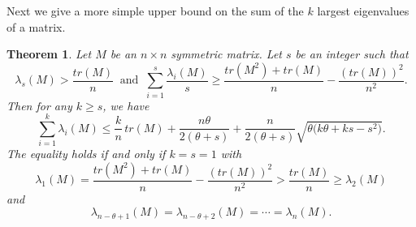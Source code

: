 \documentclass[12pt]{article}
\newtheorem{theorem}{Theorem}[section]
\begin{document}
Next we give a more simple upper bound on the sum of the $k$ largest eigenvalues of a matrix.
 \begin{theorem} \label{th4} Let $M$ be an $n\times n$ symmetric matrix. Let $s$ be an integer such that 
 $$\lambda_s(M)>\frac{tr(M)}{n}~\mbox{ and }~\sum\limits_{i=1}^s\frac{\lambda_i(M)}{s}\geq \frac{tr(M^2)+tr(M)}{n}-\frac{(tr(M))^2}{n^2}.$$ 
Then for any $k\geq s$, we have
\begin{equation}
 \sum_{i=1}^{k}\lambda_i(M)\leq\frac{k}{n}\,tr(M)+\frac{n\theta}{2(\theta+s)}+\frac{n}{2(\theta+s)}\sqrt{\theta\big(k\theta+ks-s^2\big)}.  \label{nne1}
\end{equation}
The equality holds if and only if $k=s=1$ with 
$$\lambda_1(M)=\frac{tr(M^2)+tr(M)}{n}-\frac{(tr(M))^2}{n^2}>\frac{tr(M)}{n}\geq \lambda_{2}(M)$$ 
and 
$$\lambda_{n-\theta+1}(M)=\lambda_{n-\theta+2}(M)=\cdots=\lambda_n(M).$$
\end{theorem}
\end{document}
